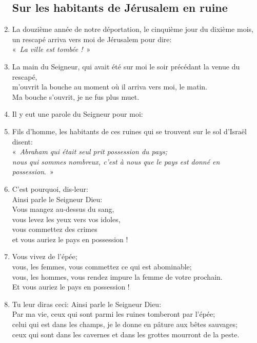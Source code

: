 \begin{enumerate}[leftmargin=\psleftmargin, labelsep = \pslabelsep, label={\arabic*}, font=\color{\pscolor}\small\textsuperscript, parsep=0em, itemsep=0em, topsep=0em ]
          \subsection*{Sur les habitants de Jérusalem en ruine}
    \item La douzième année de notre déportation, le cinquième jour du dixième mois,\\ un rescapé arriva vers moi de Jérusalem pour dire:  \\ \decalage «~\textit{La ville est tombée !}~»
    \item La main du Seigneur, qui avait été sur moi le soir précédant la venue du rescapé, \\ m’ouvrit la bouche au moment où il arriva vers moi, le matin. \\ Ma bouche s’ouvrit, je ne fus plus muet. \verseSpace
    \item Il y eut une parole du Seigneur pour moi:
    \item Fils d’homme, les habitants de ces ruines qui se trouvent sur le sol d’Israël disent: \\\decalage  «~\textit{Abraham qui était seul prit possession du pays; \\ \decalage nous qui sommes nombreux, c’est à nous que le pays est donné en possession}.~» \verseSpace
    \item C’est pourquoi, dis-leur: \\ Ainsi parle le Seigneur Dieu: \\ Vous mangez au-dessus du sang, \\ vous levez les yeux vers vos idoles, \\ vous commettez des crimes \\ et vous auriez le pays en possession !
    \item Vous vivez de l’épée; \\ vous, les femmes, vous commettez ce qui est abominable; \\ vous, les hommes, vous rendez impure la femme de votre prochain. \\ Et vous auriez le pays en possession ! \verseSpace
    \item Tu leur diras ceci: Ainsi parle le Seigneur Dieu: \\ Par ma vie, ceux qui sont parmi les ruines tomberont par l’épée; \\ celui qui est dans les champs, je le donne en pâture aux bêtes sauvages; \\ ceux qui sont dans les cavernes et dans les grottes mourront de la peste.

\end{enumerate}

